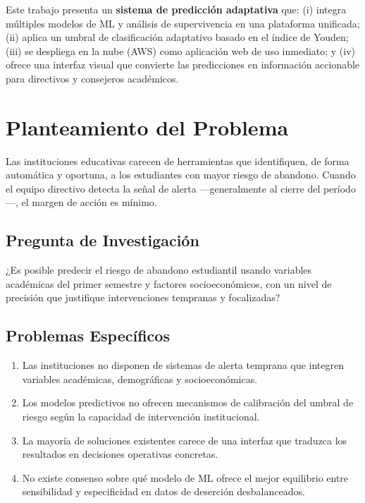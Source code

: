 \documentclass[12pt]{article}
\begin{document}
Este trabajo presenta un \textbf{sistema de predicción adaptativa} que: (i) integra
múltiples modelos de ML y análisis de supervivencia en una plataforma unificada;
(ii) aplica un umbral de clasificación adaptativo basado en el índice de Youden;
(iii) se despliega en la nube (AWS) como aplicación web de uso inmediato;
y (iv) ofrece una interfaz visual que convierte las predicciones en información
accionable para directivos y consejeros académicos.

\section{Planteamiento del Problema}

Las instituciones educativas carecen de herramientas que identifiquen, de forma
automática y oportuna, a los estudiantes con mayor riesgo de abandono. Cuando el
equipo directivo detecta la señal de alerta —generalmente al cierre del período—, el
margen de acción es mínimo.

\subsection{Pregunta de Investigación}

¿Es posible predecir el riesgo de abandono estudiantil usando variables académicas
del primer semestre y factores socioeconómicos, con un nivel de precisión que justifique
intervenciones tempranas y focalizadas?

\subsection{Problemas Específicos}

\begin{enumerate}[label=\textbf{P\arabic*.}]
    \item Las instituciones no disponen de sistemas de alerta temprana que integren
          variables académicas, demográficas y socioeconómicas.
    \item Los modelos predictivos no ofrecen mecanismos de calibración del umbral de
          riesgo según la capacidad de intervención institucional.
    \item La mayoría de soluciones existentes carece de una interfaz que traduzca los
          resultados en decisiones operativas concretas.
    \item No existe consenso sobre qué modelo de ML ofrece el mejor equilibrio entre
          sensibilidad y especificidad en datos de deserción desbalanceados.
\end{enumerate}
\end{document}
